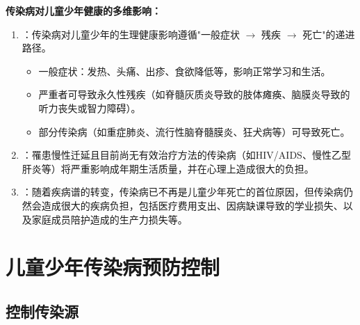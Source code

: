 \begin{keybox}
\textbf{传染病对儿童少年健康的多维影响：}

\begin{enumerate}[leftmargin=*]
    \item {}：传染病对儿童少年的生理健康影响遵循"一般症状 $\to$ 残疾 $\to$ 死亡"的递进路径。
    \begin{itemize}[leftmargin=*]
        \item 一般症状：发热、头痛、出疹、食欲降低等，影响正常学习和生活。
        \item 严重者可导致永久性残疾（如脊髓灰质炎导致的肢体瘫痪、脑膜炎导致的听力丧失或智力障碍）。
        \item 部分传染病（如重症肺炎、流行性脑脊髓膜炎、狂犬病等）可导致死亡。
    \end{itemize}

    \item {}：罹患慢性迁延且目前尚无有效治疗方法的传染病（如HIV/AIDS、慢性乙型肝炎等）将严重影响成年期生活质量，并在心理上造成很大的负担。

    \item {}：随着疾病谱的转变，传染病已不再是儿童少年死亡的首位原因，但传染病仍然会造成很大的疾病负担，包括医疗费用支出、因病缺课导致的学业损失、以及家庭成员陪护造成的生产力损失等。
\end{enumerate}
\end{keybox}

\section{儿童少年传染病预防控制}

\subsection{控制传染源}

